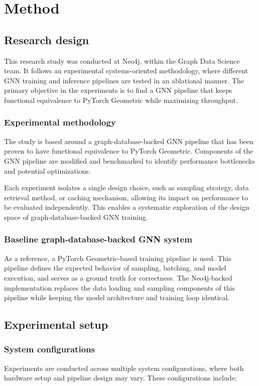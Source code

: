 \documentclass[PhD]{uclathes}
\begin{document}
\chapter{Method}

\section{Research design}
This research study was conducted at Neo4j, within the Graph Data Science team.
It follows an experimental systems-oriented methodology, where different GNN
training and inference pipelines are tested in an ablational manner. The
primary objective in the experiments is to find a GNN pipeline that keeps
functional equivalence to PyTorch Geometric while maximizing throughput.

\subsection{Experimental methodology}
The study is based around a graph-database-backed GNN pipeline that has been
proven to have functional equivalence to PyTorch Geometric. Components of the
GNN pipeline are modified and benchmarked to identify performance bottlenecks
and potential optimizations.

Each experiment isolates a single design choice, such as sampling strategy,
data retrieval method, or caching mechanism, allowing its impact on performance
to be evaluated independently. This enables a systematic exploration of the
design space of graph-database-backed GNN training.

\subsection{Baseline graph-database-backed GNN system}
As a reference, a PyTorch Geometric-based training pipeline is used. This
pipeline defines the expected behavior of sampling, batching, and model
execution, and serves as a ground truth for correctness. The Neo4j-backed
implementation replaces the data loading and sampling components of this
pipeline while keeping the model architecture and training loop identical.

\section{Experimental setup}
\subsection{System configurations}
Experiments are conducted across multiple system configurations, where both
hardware setup and pipeline design may vary. These configurations include:
\end{document}
